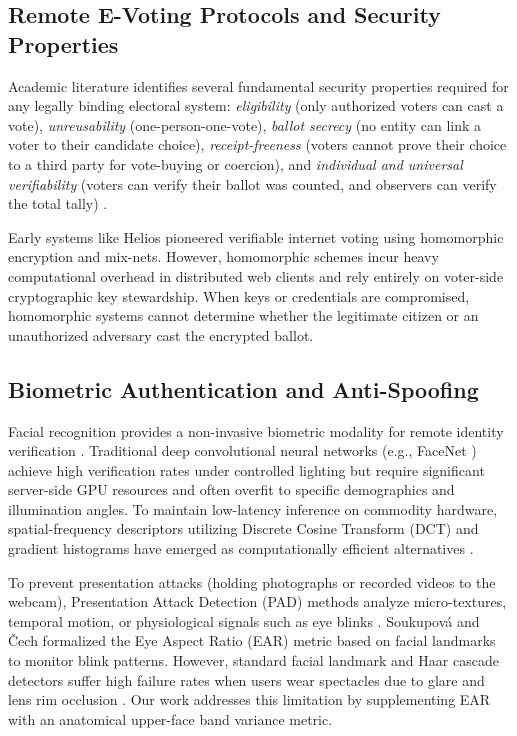 \documentclass[conference]{IEEEtran}
\begin{document}
\subsection{Remote E-Voting Protocols and Security Properties}
Academic literature identifies several fundamental security properties required for any legally binding electoral system: \textit{eligibility} (only authorized voters can cast a vote), \textit{unreusability} (one-person-one-vote), \textit{ballot secrecy} (no entity can link a voter to their candidate choice), \textit{receipt-freeness} (voters cannot prove their choice to a third party for vote-buying or coercion), and \textit{individual and universal verifiability} (voters can verify their ballot was counted, and observers can verify the total tally) \cite{cortier2016election, benaloh1987verifiable}. 

Early systems like Helios \cite{adida2008helios} pioneered verifiable internet voting using homomorphic encryption and mix-nets. However, homomorphic schemes incur heavy computational overhead in distributed web clients and rely entirely on voter-side cryptographic key stewardship. When keys or credentials are compromised, homomorphic systems cannot determine whether the legitimate citizen or an unauthorized adversary cast the encrypted ballot.

\subsection{Biometric Authentication and Anti-Spoofing}
Facial recognition provides a non-invasive biometric modality for remote identity verification \cite{jain2007handbook}. Traditional deep convolutional neural networks (e.g., FaceNet \cite{schroff2015facenet}) achieve high verification rates under controlled lighting but require significant server-side GPU resources and often overfit to specific demographics and illumination angles. To maintain low-latency inference on commodity hardware, spatial-frequency descriptors utilizing Discrete Cosine Transform (DCT) and gradient histograms have emerged as computationally efficient alternatives \cite{hafed2001face}.

To prevent presentation attacks (holding photographs or recorded videos to the webcam), Presentation Attack Detection (PAD) methods analyze micro-textures, temporal motion, or physiological signals such as eye blinks \cite{patel2015live}. Soukupov{\'a} and {\v{C}}ech \cite{soukupova2016real} formalized the Eye Aspect Ratio (EAR) metric based on facial landmarks to monitor blink patterns. However, standard facial landmark and Haar cascade detectors suffer high failure rates when users wear spectacles due to glare and lens rim occlusion \cite{viola2004robust}. Our work addresses this limitation by supplementing EAR with an anatomical upper-face band variance metric.
\end{document}
